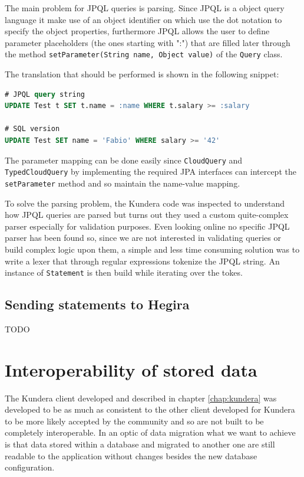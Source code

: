\newparagraph The main problem for JPQL queries is parsing. Since JPQL is a  object query language it make use of an object identifier on which use the dot notation to specify the object properties, furthermore JPQL allows the user to define parameter placeholders (the ones starting with ":") that are filled later through the method \texttt{setParameter(String name, Object value)} of the \texttt{Query} class.

\noindent The translation that should be performed is shown in the following snippet:

\begin{lstlisting}[language=SQL, caption=JPQL to SQL translation, label=code:query-translation, numbers=none]
# JPQL query string
UPDATE Test t SET t.name = :name WHERE t.salary >= :salary

# SQL version
UPDATE Test SET name = 'Fabio' WHERE salary >= '42'
\end{lstlisting} 

\noindent The parameter mapping can be done easily since \texttt{CloudQuery} and \texttt{TypedCloudQuery} by implementing the required JPA interfaces can intercept the \texttt{setParameter} method and so maintain the name-value mapping.

\newparagraph To solve the parsing problem, the Kundera code was inspected to understand how JPQL queries are parsed but turns out they used a custom quite-complex parser especially for validation purposes. Even looking online no specific JPQL parser has been found so, since we are not interested in validating queries or build complex logic upon them, a simple and less time consuming solution was to write a lexer that through regular expressions tokenize the JPQL string. An instance of \texttt{Statement} is then build while iterating over the tokes.

\subsection{Sending statements to Hegira}
TODO

\section{Interoperability of stored data}
The Kundera client developed and described in chapter \ref{chap:kundera} was developed to be as much as consistent to the other client developed for Kundera to be more likely accepted by the community and so are not built to be completely interoperable.
In an optic of data migration what we want to achieve is that data stored within a database and migrated to another one are still readable to the application without changes besides the new database configuration. 


